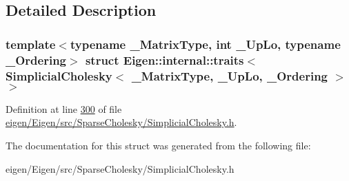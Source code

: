 \subsection{Detailed Description}
\subsubsection*{template$<$typename \+\_\+\+Matrix\+Type, int \+\_\+\+Up\+Lo, typename \+\_\+\+Ordering$>$\newline
struct Eigen\+::internal\+::traits$<$ Simplicial\+Cholesky$<$ \+\_\+\+Matrix\+Type, \+\_\+\+Up\+Lo, \+\_\+\+Ordering $>$ $>$}



Definition at line \hyperlink{eigen_2_eigen_2src_2_sparse_cholesky_2_simplicial_cholesky_8h_source_l00300}{300} of file \hyperlink{eigen_2_eigen_2src_2_sparse_cholesky_2_simplicial_cholesky_8h_source}{eigen/\+Eigen/src/\+Sparse\+Cholesky/\+Simplicial\+Cholesky.\+h}.



The documentation for this struct was generated from the following file\+:\begin{DoxyCompactItemize}
\item 
eigen/\+Eigen/src/\+Sparse\+Cholesky/\+Simplicial\+Cholesky.\+h\end{DoxyCompactItemize}
